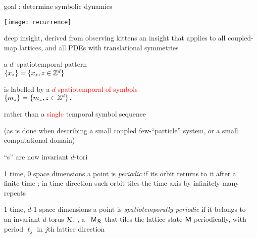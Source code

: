 \begin{frame}{
goal
: determine symbolic dynamics
             }
\begin{center}
\texttt{[image: recurrence]}
\end{center}

\end{frame}

\begin{frame}{deep insight, derived from observing kittens}
an insight that applies
to all coupled-map lattices, and all PDEs with translational symmetries

\bigskip

a $d$\dmn\ spatiotemporal pattern\\
\(
\{x_{z}\} = \{x_{z},  z\in \mathbb{Z}^{d}  \}
\)

\bigskip

is labelled by a \textcolor{red}{{\em $d$\dmn} spatiotemporal {\brick} of symbols}\\
\(
\{m_{z}\} = \{m_{z}, z\in \mathbb{Z}^{d}\}
\,,
\)

\vfill

rather than a \textcolor{red}{single} temporal symbol sequence


\bigskip

(as is done
when describing a small coupled few-``particle'' system, or a small
computational domain)
\end{frame}


\begin{frame}{``\po s'' are now invariant $d$-tori}


\begin{block}{1 time, 0 space dimensions}
a {\statesp} point is {\em periodic} if its orbit returns to it
after a finite time \period{}; in time direction such orbit tiles the time axis
by infinitely many repeats
\end{block}

\bigskip

\begin{block}{1 time, $d$-1 space dimensions}
 a {\statesp} point is {\em spatiotemporally periodic} if
it belongs to an invariant $d$-torus ${\mathcal{R}}$, \ie, a \brick\ $\mathsf{M}_{\mathcal{R}}$ that
tiles the lattice state  $\mathsf{M}$ periodically, with period $\ell_j$ in
$j$th lattice direction
\end{block}
\end{frame}

